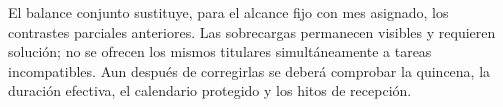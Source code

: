 
El balance conjunto sustituye, para el alcance fijo con mes asignado, los contrastes parciales anteriores. Las sobrecargas permanecen visibles y requieren solución; no se ofrecen los mismos titulares simultáneamente a tareas incompatibles. Aun después de corregirlas se deberá comprobar la quincena, la duración efectiva, el calendario protegido y los hitos de recepción.
